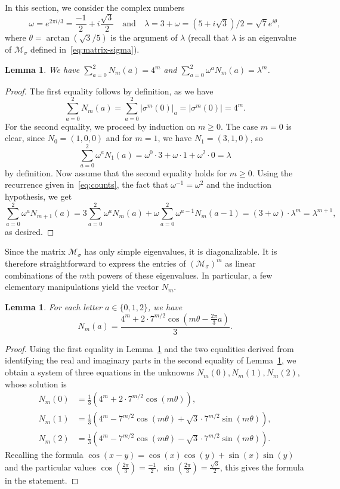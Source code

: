 \documentclass[12pt]{article}
\theoremstyle{plain}
\newtheorem{lemma}[theorem]{Lemma}
\theoremstyle{definition}
\theoremstyle{remark}
\numberwithin{equation}{section}
\begin{document}
In this section, we consider the complex numbers
\[
\omega=e^{2\pi i/3} = \frac{-1}{2} + i \frac{\sqrt{3}}{2} \quad \text{and} \quad
\lambda=3+\omega=(5+i\sqrt3)/2=\sqrt7e^{i\theta},
\]
where $\theta = \arctan(\sqrt{3}/5)$ is the argument of $\lambda$ (recall that $\lambda$ is an eigenvalue of $\mathcal{M}_\sigma$ defined in~\eqref{eq:matrix-sigma}).

\begin{lemma}
\label{lem:sum-and-weightedsum}
We have $\sum_{a=0}^2 N_m(a) = 4^m$ and $\sum_{a=0}^2 \omega^a N_m(a) =\lambda^m$.
\end{lemma}
\begin{proof}
The first equality follows by definition, as we have
\[
\sum_{a=0}^2 N_m(a) = \sum_{a=0}^2 \lvert\sigma^m(0)\rvert_a = \lvert \sigma^m(0) \rvert = 4^m.
\]
For the second equality, we proceed by induction on $m\ge 0$.
The case $m=0$ is clear, since $N_0=(1,0,0)$ and for $m=1$, we have $N_1=(3,1,0)$, so
\[
\sum_{a=0}^2 \omega^a N_1(a) = \omega^0 \cdot 3 + \omega \cdot 1 + \omega^2 \cdot 0 = \lambda
\]
by definition.
Now assume that the second equality holds for $m\ge 0$.
Using the recurrence given in~\eqref{eq:counts}, the fact that $\omega^{-1}=\omega^2$ and the induction hypothesis, we get
\[
\sum_{a=0}^2 \omega^a N_{m+1}(a)
= 3 \sum_{a=0}^2 \omega^a N_m(a) + \omega \sum_{a=0}^2 \omega^{a-1} N_m(a-1) 
= (3 + \omega) \cdot \lambda^m = \lambda^{m+1},
\]
as desired.
\end{proof}

Since the matrix $\mathcal{M}_\sigma$ has only simple eigenvalues, it is diagonalizable. It is therefore straightforward to express the entries of $(\mathcal{M}_\sigma)^m$ as linear combinations of the $m$th powers of these eigenvalues. In particular, a few elementary manipulations yield the vector $N_m$.

\begin{lemma}
\label{lem:cosines}
For each letter $a\in\{0,1,2\}$, we have
\[
N_m(a)=\frac{4^m+2\cdot 7^{m/2}\cos\left(m\theta- \frac{2\pi}{3}a\right)}{3}.
\]
\end{lemma}
\begin{proof}
Using the first equality in Lemma~\ref{lem:sum-and-weightedsum} and the two equalities derived from identifying the real and imaginary parts in the second equality of Lemma~\ref{lem:sum-and-weightedsum}, we obtain a system of three equations in the unknowns $N_m(0),N_m(1),N_m(2)$, whose solution is
\begin{align}
N_m(0) &= \frac{1}{3} \left( 4^m + 2 \cdot 7^{m/2} \cos(m\theta)\right), \label{nm0}\\
N_m(1) &= \frac{1}{3} \left( 4^m - 7^{m/2} \cos(m\theta) + \sqrt{3} \cdot 7^{m/2} \sin(m\theta) \right), \label{nm1}\\
N_m(2) &= \frac{1}{3} \left( 4^m - 7^{m/2} \cos(m\theta) - \sqrt{3} \cdot  7^{m/2} \sin(m\theta) \right). \label{nm2}
\end{align}
Recalling the formula $\cos(x-y)=\cos(x)\cos(y)+\sin(x)\sin(y)$ and the particular values $\cos(\frac{2\pi}{3})=\frac{-1}{2}$, $\sin(\frac{2\pi}{3})=\frac{\sqrt{3}}{2}$, this gives the formula in the statement.
\end{proof}
\end{document}
